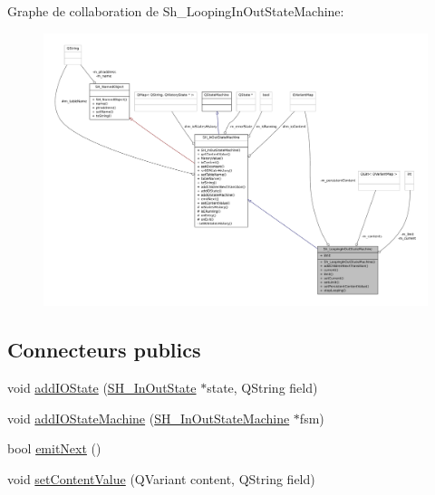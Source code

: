 Graphe de collaboration de Sh\-\_\-\-Looping\-In\-Out\-State\-Machine\-:
\nopagebreak
\begin{figure}[H]
\begin{center}
\leavevmode
\includegraphics[width=350pt]{classSh__LoopingInOutStateMachine__coll__graph}
\end{center}
\end{figure}
\subsection*{Connecteurs publics}
\begin{DoxyCompactItemize}
\item 
void \hyperlink{classSH__InOutStateMachine_a2528cffddbe6f98c32ebef41423c0118}{add\-I\-O\-State} (\hyperlink{classSH__InOutState}{S\-H\-\_\-\-In\-Out\-State} $\ast$state, Q\-String field)
\item 
void \hyperlink{classSH__InOutStateMachine_a6f65dff277508e650eb697628c857b19}{add\-I\-O\-State\-Machine} (\hyperlink{classSH__InOutStateMachine}{S\-H\-\_\-\-In\-Out\-State\-Machine} $\ast$fsm)
\item 
bool \hyperlink{classSH__InOutStateMachine_ae2e88ff50d32d4f10454545f1173097d}{emit\-Next} ()
\item 
void \hyperlink{classSH__InOutStateMachine_a9ab1534306b2bdb62743d4bcefe40c17}{set\-Content\-Value} (Q\-Variant content, Q\-String field)
\end{DoxyCompactItemize}
